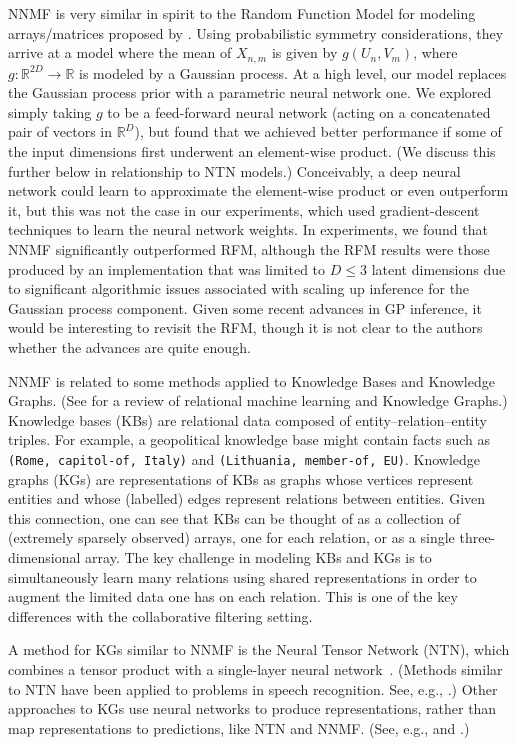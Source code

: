 \documentclass{article} \usepackage{iclr2016_conference,times}
\newcommand{\Reals}{\mathbb{R}}
\begin{document}
NNMF is very similar in spirit to the Random Function Model for modeling arrays/matrices proposed by \citet{RFMLloyd}.  Using probabilistic symmetry considerations, they arrive at a model where the mean of $X_{n,m}$ is given by $g(U_n,V_m)$, where $g : \Reals^{2D} \to \Reals$ is modeled by a Gaussian process.
At a  high level, our model replaces the Gaussian process prior with a parametric neural network one. 
We explored simply taking $g$ to be a feed-forward neural network (acting on a concatenated pair of vectors in $\Reals^D$), but found that we achieved better performance if some of the input dimensions first underwent an element-wise product. (We discuss this further below in relationship to NTN models.)  Conceivably, a deep neural network could learn to approximate the element-wise product or even outperform it, but this was not the case in our experiments, which used gradient-descent techniques to learn the neural network weights. In experiments, we found that NNMF significantly outperformed RFM, although the  RFM results were those produced by an implementation that was limited to $D \le 3$ latent dimensions due to significant algorithmic issues associated with scaling up inference for the Gaussian process component.  Given some recent advances in GP inference, it would be interesting to revisit the RFM, though it is not clear to the authors whether the advances are quite enough.

NNMF is related to some methods applied to Knowledge Bases and Knowledge Graphs. (See \citep{NickelMurphy2015} for a review of relational machine learning and Knowledge Graphs.)
Knowledge bases (KBs) are relational data composed of entity--relation--entity triples.   
For example, a geopolitical knowledge base might contain facts such as
\texttt{(Rome, capitol-of, Italy)} and \texttt{(Lithuania, member-of, EU)}.
Knowledge graphs (KGs) are representations of KBs as graphs
whose vertices represent entities and whose (labelled) edges represent relations between entities. 
Given this connection, one can see that KBs can be thought of as a collection of (extremely sparsely observed) arrays, one for each relation, or as a single three-dimensional array.
The key challenge in modeling KBs and KGs is to simultaneously learn many relations using shared representations in order to augment the limited data one has on each relation.  This is one of the key differences with the collaborative filtering setting. 

A method for KGs similar to NNMF is the Neural Tensor Network (NTN), which combines a tensor product with a single-layer neural network~\citep{NTN2013}.  
(Methods similar to NTN have been applied to problems in speech recognition. See, e.g., \citep{YuDS2013}.)
Other approaches to KGs use neural networks to produce representations, rather than map representations to predictions, like NTN and NNMF.  (See, e.g., \citep{HuangHJ15} and \citep{BGL2014}.)
\end{document}
